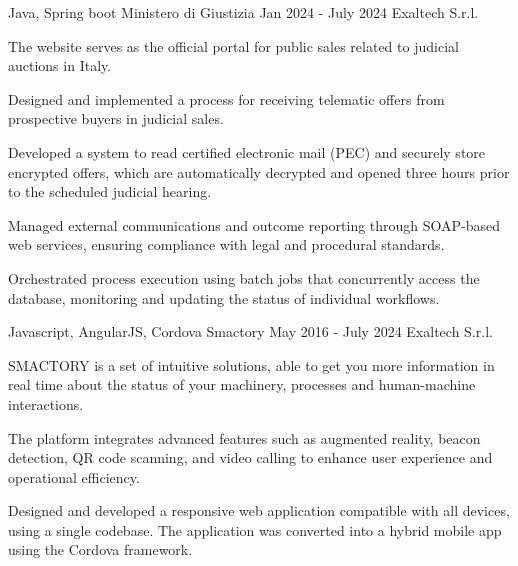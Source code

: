 \begin{cventries}
  \cventry
    {Java, Spring boot} %
    {Ministero di Giustizia} %
    {Jan 2024 - July 2024} %
    {Exaltech S.r.l.} %
    {
      \begin{cvitems} %
        \item {The website serves as the official portal for public sales related to judicial auctions in Italy.}
        \item {Designed and implemented a process for receiving telematic offers from prospective buyers in judicial sales.}
        \item {Developed a system to read certified electronic mail (PEC) and securely store encrypted offers, which are automatically decrypted and opened three hours prior to the scheduled judicial hearing.}  
        \item {Managed external communications and outcome reporting through SOAP-based web services, ensuring compliance with legal and procedural standards.}  
        \item {Orchestrated process execution using batch jobs that concurrently access the database, monitoring and updating the status of individual workflows.}  
      \end{cvitems}
    }

  \cventry
    {Javascript, AngularJS, Cordova} %
    {Smactory} %
    {May 2016 - July 2024} %
    {Exaltech S.r.l.} %
    {
      \begin{cvitems} %
        \item {SMACTORY is a set of intuitive solutions, able to get you more information in real time about the status of your machinery, processes and human-machine interactions.}
        \item {The platform integrates advanced features such as augmented reality, beacon detection, QR code scanning, and video calling to enhance user experience and operational efficiency.}  
        \item {Designed and developed a responsive web application compatible with all devices, using a single codebase. The application was converted into a hybrid mobile app using the Cordova framework.}  
      \end{cvitems}
    }
\end{cventries}
